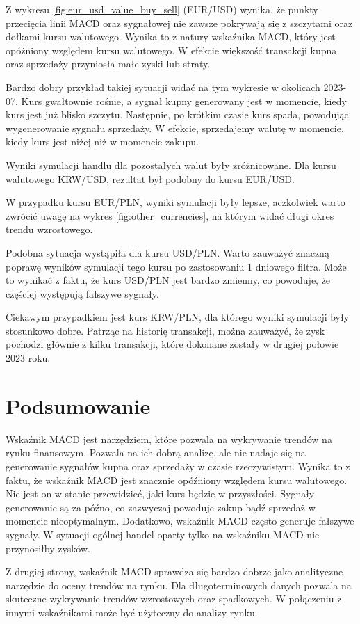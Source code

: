 \documentclass[12pt, a4paper]{article}
\begin{document}
Z wykresu \ref{fig:eur_usd_value_buy_sell} (EUR/USD) wynika, że punkty przecięcia linii MACD oraz sygnałowej
nie zawsze pokrywają się z szczytami oraz dołkami kursu walutowego. Wynika to z natury wskaźnika MACD,
który jest opóźniony względem kursu walutowego. W efekcie większość transakcji kupna oraz sprzedaży
przyniosła małe zyski lub straty.

Bardzo dobry przykład takiej sytuacji widać na tym wykresie w okolicach 2023-07. Kurs
gwałtownie rośnie, a sygnał kupny generowany jest w momencie, kiedy kurs jest już blisko szczytu.
Następnie, po krótkim czasie kurs spada, powodując wygenerowanie sygnału sprzedaży.
W efekcie, sprzedajemy walutę w momencie, kiedy kurs jest niżej niż w momencie zakupu.

Wyniki symulacji handlu dla pozostałych walut były zróżnicowane. Dla kursu walutowego KRW/USD,
rezultat był podobny do kursu EUR/USD.

W przypadku kursu EUR/PLN, wyniki symulacji były lepsze, aczkolwiek warto zwrócić uwagę na
wykres \ref{fig:other_currencies}, na którym widać długi okres trendu wzrostowego.

Podobna sytuacja wystąpiła dla kursu USD/PLN. Warto zauważyć znaczną poprawę wyników symulacji
tego kursu po zastosowaniu 1 dniowego filtra. Może to wynikać z faktu, że kurs USD/PLN jest
bardzo zmienny, co powoduje, że częściej występują fałszywe sygnały.

Ciekawym przypadkiem jest kurs KRW/PLN, dla którego wyniki symulacji były stosunkowo dobre. Patrząc
na historię transakcji, można zauważyć, że zysk pochodzi głównie z kilku transakcji, które
dokonane zostały w drugiej połowie 2023 roku.

\section{Podsumowanie}
Wskaźnik MACD jest narzędziem, które pozwala na wykrywanie trendów na rynku finansowym.
Pozwala na ich dobrą analizę, ale nie nadaje się na generowanie sygnałów kupna oraz sprzedaży
w czasie rzeczywistym. Wynika to z faktu, że wskaźnik MACD jest znacznie opóźniony
względem kursu walutowego. Nie jest on w stanie przewidzieć, jaki kurs będzie
w przyszłości. Sygnały generowanie są za późno, co zazwyczaj powoduje
zakup bądź sprzedaż w momencie nieoptymalnym. Dodatkowo, wskaźnik MACD często
generuje fałszywe sygnały. W sytuacji ogólnej handel oparty tylko
na wskaźniku MACD nie przynosiłby zysków.

Z drugiej strony, wskaźnik MACD sprawdza się bardzo dobrze jako analityczne narzędzie
do oceny trendów na rynku. Dla długoterminowych danych pozwala na skuteczne
wykrywanie trendów wzrostowych oraz spadkowych. W połączeniu z innymi wskaźnikami
może być użyteczny do analizy rynku.
\end{document}

